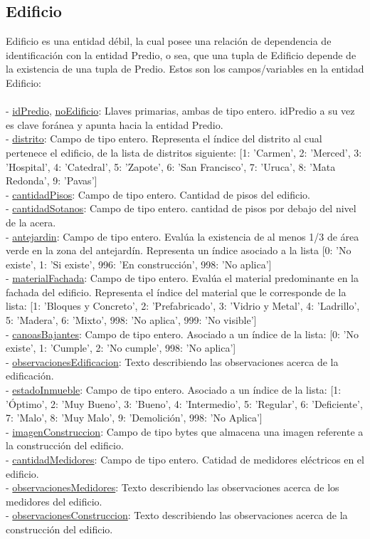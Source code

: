 \subsection{Edificio}
Edificio es una entidad débil, la cual posee una relación de dependencia de identificación con la entidad Predio, o sea, que una tupla de Edificio depende de la existencia de una tupla de Predio.
Estos son los campos/variables en la entidad Edificio:\\\\
- \underline{idPredio}, \underline{noEdificio}: Llaves primarias, ambas de tipo entero. idPredio a su vez es clave foránea y apunta hacia la entidad Predio.\\
- \underline{distrito}: Campo de tipo entero. Representa el índice del distrito al cual pertenece el edificio, de la lista de distritos siguiente: [1: 'Carmen', 2: 'Merced', 3: 'Hospital', 4: 'Catedral', 5: 'Zapote', 6: 'San Francisco', 7: 'Uruca', 8: 'Mata Redonda', 9: 'Pavas']\\
- \underline{cantidadPisos}: Campo de tipo entero. Cantidad de pisos del edificio.\\
- \underline{cantidadSotanos}: Campo de tipo entero. cantidad de pisos por debajo del nivel de la acera.\\
- \underline{antejardin}: Campo de tipo entero. Evalúa la existencia de al menos 1/3 de área verde en la zona del antejardín. Representa un índice asociado a la lista [0: 'No existe', 1: 'Si existe', 996: 'En construcción', 998: 'No aplica']\\
- \underline{materialFachada}: Campo de tipo entero. Evalúa el material predominante en la fachada del edificio. Representa el índice del material que le corresponde de la lista: [1: 'Bloques y Concreto', 2: 'Prefabricado', 3: 'Vidrio y Metal', 4: 'Ladrillo', 5: 'Madera', 6: 'Mixto', 998: 'No aplica', 999: 'No visible']\\
- \underline{canoasBajantes}: Campo de tipo entero. Asociado a un índice de la lista: [0: 'No existe', 1: 'Cumple', 2: 'No cumple', 998: 'No aplica']\\
- \underline{observacionesEdificacion}: Texto describiendo las observaciones acerca de la edificación.\\
- \underline{estadoInmueble}: Campo de tipo entero. Asociado a un índice de la lista: [1: 'Óptimo', 2: 'Muy Bueno', 3: 'Bueno', 4: 'Intermedio', 5: 'Regular', 6: 'Deficiente', 7: 'Malo', 8: 'Muy Malo', 9: 'Demolición', 998: 'No Aplica']\\
- \underline{imagenConstruccion}: Campo de tipo bytes que almacena una imagen referente a la construcción del edificio.\\
- \underline{cantidadMedidores}: Campo de tipo entero. Catidad de medidores eléctricos en el edificio.\\
- \underline{observacionesMedidores}: Texto describiendo las observaciones acerca de los medidores del edificio.\\
- \underline{observacionesConstruccion}: Texto describiendo las observaciones acerca de la construcción del edificio.\\
